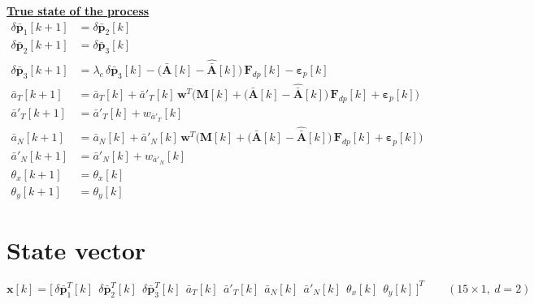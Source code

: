 \documentclass[11pt,a4paper]{ctexart}
\newcommand{\hd}[1]{\par\bigskip\noindent\underline{\textbf{#1}}}
\newcommand{\lc}{\lambda_c}
\newcommand{\dpb}{\delta\bar{\mathbf p}}
\newcommand{\Ab}{\bar{\mathbf A}}
\newcommand{\Ah}{\hat{\bar{\mathbf A}}}
\newcommand{\ww}{\mathbf w}
\newcommand{\aT}{\bar a_T}
\newcommand{\aN}{\bar a_N}
\newcommand{\apT}{\bar a'_T}
\newcommand{\apN}{\bar a'_N}
\newcommand{\Fd}{\mathbf F_{dp}}
\newcommand{\Mb}{\mathbf M}
\newcommand{\epp}{\boldsymbol\varepsilon_p}
\begin{document}
\hd{True state of the process}
\begin{align*}
\dpb_1[k+1] &= \dpb_2[k] \\
\dpb_2[k+1] &= \dpb_3[k] \\
\dpb_3[k+1] &= \lc\,\dpb_3[k] - \big(\Ab[k] - \Ah[k]\big)\,\Fd[k] - \epp[k] \\
\aT[k+1] &= \aT[k] + \apT[k]\,\ww^{T}\Big(\Mb[k] + \big(\Ab[k] - \Ah[k]\big)\,\Fd[k] + \epp[k]\Big) \\
\apT[k+1] &= \apT[k] + w_{\apT}[k] \\
\aN[k+1] &= \aN[k] + \apN[k]\,\ww^{T}\Big(\Mb[k] + \big(\Ab[k] - \Ah[k]\big)\,\Fd[k] + \epp[k]\Big) \\
\apN[k+1] &= \apN[k] + w_{\apN}[k] \\
\theta_x[k+1] &= \theta_x[k] \\
\theta_y[k+1] &= \theta_y[k]
\end{align*}

\section{State vector}
\[
\mathbf x[k] = \big[\,\dpb_1^{T}[k]\ \ \dpb_2^{T}[k]\ \ \dpb_3^{T}[k]\ \ \aT[k]\ \ \apT[k]\ \ \aN[k]\ \ \apN[k]\ \ \theta_x[k]\ \ \theta_y[k]\,\big]^{T} \qquad (15 \times 1,\ d = 2)
\]

\end{document}
